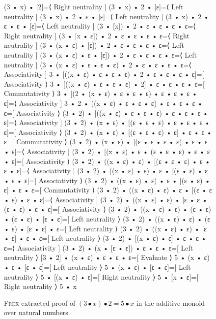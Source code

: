 \begin{figure}
	\begin{mathpar}
(3 • x) • [2]\explain={⟨ Right neutrality ]}
(3 • x) • 2 • [ε]\explain={⟨ Left neutrality ]}
(3 • x) • 2 • ε • [ε]\explain={⟨ Left neutrality ]}
(3 • x) • 2 • ε • ε • [ε]\explain={⟨ Left neutrality ]}
(3 • [x]) • 2 • ε • ε • ε • ε\explain={⟨ Right neutrality ]}
(3 • [x • ε]) • 2 • ε • ε • ε • ε\explain={⟨ Right neutrality ]}
(3 • (x • ε) • [ε]) • 2 • ε • ε • ε • ε\explain={⟨ Left neutrality ]}
(3 • (x • ε) • ε • [ε]) • 2 • ε • ε • ε • ε\explain={⟨ Left neutrality ]}
(3 • (x • ε) • ε • ε • ε) • 2 • ε • ε • ε • ε\explain={⟨ Associativity ]}
3 • [((x • ε) • ε • ε • ε) • 2 • ε • ε • ε • ε]\explain={[ Associativity ⟩}
3 • [((x • ε) • ε • ε • ε) • 2] • ε • ε • ε • ε\explain={[ Commutativity ⟩}
3 • [(2 • (x • ε) • ε • ε • ε) • ε • ε • ε • ε]\explain={⟨ Associativity ]}
3 • 2 • ((x • ε) • ε • ε • ε) • ε • ε • ε • ε\explain={[ Associativity ⟩}
(3 • 2) • [((x • ε) • ε • ε • ε) • ε • ε • ε • ε]\explain={⟨ Associativity ]}
(3 • 2) • (x • ε) • [(ε • ε • ε) • ε • ε • ε • ε]\explain={[ Associativity ⟩}
(3 • 2) • (x • ε) • [(ε • ε • ε) • ε] • ε • ε • ε\explain={[ Commutativity ⟩}
(3 • 2) • (x • ε) • [(ε • ε • ε • ε) • ε • ε • ε]\explain={⟨ Associativity ]}
(3 • 2) • [(x • ε) • ε • (ε • ε • ε) • ε • ε • ε]\explain={[ Associativity ⟩}
(3 • 2) • ((x • ε) • ε) • [(ε • ε • ε) • ε • ε • ε]\explain={⟨ Associativity ]}
(3 • 2) • ((x • ε) • ε) • ε • [(ε • ε) • ε • ε • ε]\explain={[ Associativity ⟩}
(3 • 2) • ((x • ε) • ε) • ε • [(ε • ε) • ε] • ε • ε\explain={[ Commutativity ⟩}
(3 • 2) • ((x • ε) • ε) • ε • [(ε • ε • ε) • ε • ε]\explain={⟨ Associativity ]}
(3 • 2) • ((x • ε) • ε) • [ε • ε • (ε • ε) • ε • ε]\explain={[ Associativity ⟩}
(3 • 2) • ((x • ε) • ε) • (ε • ε) • (ε • ε) • [ε • ε]\explain={[ Left neutrality ⟩}
(3 • 2) • ((x • ε) • ε) • (ε • ε) • [ε • ε] • ε\explain={[ Left neutrality ⟩}
(3 • 2) • ((x • ε) • ε) • [ε • ε] • ε • ε\explain={[ Left neutrality ⟩}
(3 • 2) • [(x • ε) • ε] • ε • ε • ε\explain={⟨ Associativity ]}
(3 • 2) • (x • [ε • ε]) • ε • ε • ε\explain={[ Left neutrality ⟩}
[3 • 2] • (x • ε) • ε • ε • ε\explain={[ Evaluate ⟩}
5 • (x • ε) • ε • [ε • ε]\explain={[ Left neutrality ⟩}
5 • (x • ε) • [ε • ε]\explain={[ Left neutrality ⟩}
5 • [(x • ε) • ε]\explain={[ Right neutrality ⟩}
5 • [x • ε]\explain={[ Right neutrality ⟩}
5 • x
\end{mathpar}
\caption{\textsc{Frex}-extracted proof of $(3 • x) • 2 = 5 • x$ in the additive monoid over natural numbers.}
\label{fig:frex_proof_extracted}
\end{figure}
\newpage

